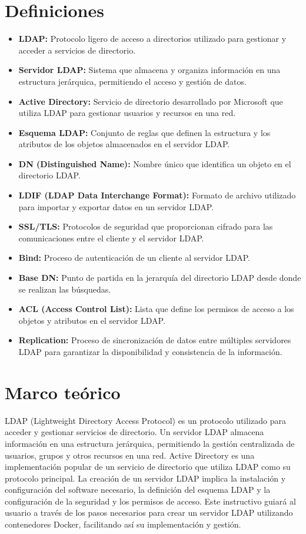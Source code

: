 \documentclass[a4paper,twoside,draft,onecolumn]{article}
\begin{document}
\section{Definiciones}
\begin{itemize}
    \item \textbf{LDAP:} Protocolo ligero de acceso a directorios utilizado para gestionar y acceder a servicios de directorio.
    \item \textbf{Servidor LDAP:} Sistema que almacena y organiza información en una estructura jerárquica, permitiendo el acceso y gestión de datos.
    \item \textbf{Active Directory:} Servicio de directorio desarrollado por Microsoft que utiliza LDAP para gestionar usuarios y recursos en una red.
    \item \textbf{Esquema LDAP:} Conjunto de reglas que definen la estructura y los atributos de los objetos almacenados en el servidor LDAP.
    \item \textbf{DN (Distinguished Name):} Nombre único que identifica un objeto en el directorio LDAP.
    \item \textbf{LDIF (LDAP Data Interchange Format):} Formato de archivo utilizado para importar y exportar datos en un servidor LDAP.
    \item \textbf{SSL/TLS:} Protocolos de seguridad que proporcionan cifrado para las comunicaciones entre el cliente y el servidor LDAP.
    \item \textbf{Bind:} Proceso de autenticación de un cliente al servidor LDAP.
    \item \textbf{Base DN:} Punto de partida en la jerarquía del directorio LDAP desde donde se realizan las búsquedas.
    \item \textbf{ACL (Access Control List):} Lista que define los permisos de acceso a los objetos y atributos en el servidor LDAP.
    \item \textbf{Replication:} Proceso de sincronización de datos entre múltiples servidores LDAP para garantizar la disponibilidad y consistencia de la información.
\end{itemize}
\section{Marco te\'orico}
LDAP (Lightweight Directory Access Protocol) es un protocolo utilizado para acceder y gestionar servicios de directorio. Un servidor LDAP almacena información en una estructura jerárquica, permitiendo la gestión centralizada de usuarios, grupos y otros recursos en una red. Active Directory es una implementación popular de un servicio de directorio que utiliza LDAP como su protocolo principal. La creación de un servidor LDAP implica la instalación y configuración del software necesario, la definición del esquema LDAP
y la configuración de la seguridad y los permisos de acceso. Este instructivo guiará al usuario a través de los pasos necesarios para crear un servidor LDAP utilizando contenedores Docker, facilitando así su implementación y gestión.
\end{document}
